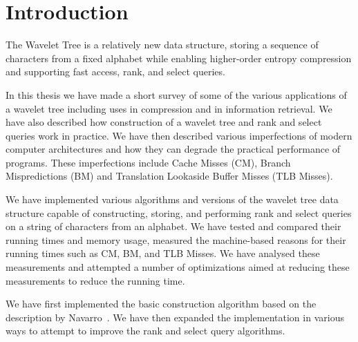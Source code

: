 \section{Introduction}
The Wavelet Tree is a relatively new data structure, storing a sequence of characters from a fixed alphabet while enabling higher-order entropy compression and supporting fast access, rank, and select queries.


In this thesis we have made a short survey of some of the various applications of a wavelet tree including uses in compression and in information retrieval.
We have also described how construction of a wavelet tree and rank and select queries work in practice.
We have then described various imperfections of modern computer architectures and how they can degrade the practical performance of programs.
These imperfections include Cache Misses (CM), Branch Mispredictions (BM) and Translation Lookaside Buffer Misses (TLB Misses).

We have implemented various algorithms and versions of the wavelet tree data structure capable of constructing, storing, and performing rank and select queries on a string of characters from an alphabet. We have tested and compared their running times and memory usage, measured the machine-based reasons for their running times such as CM, BM, and TLB Misses. We have analysed these measurements and attempted a number of optimizations aimed at reducing these measurements to reduce the running time.

We have first implemented the basic construction algorithm based on the description by Navarro~.
We have then expanded the implementation in various ways to attempt to improve the rank and select query algorithms.

